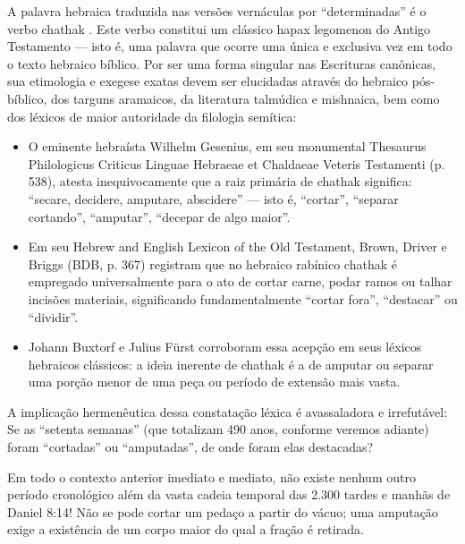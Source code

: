 A palavra hebraica traduzida nas versões vernáculas por ``determinadas'' é o verbo chathak . Este verbo constitui um clássico hapax legomenon do Antigo Testamento — isto é, uma palavra que ocorre uma única e exclusiva vez em todo o texto hebraico bíblico. Por ser uma forma singular nas Escrituras canônicas, sua etimologia e exegese exatas devem ser elucidadas através do hebraico pós-bíblico, dos targuns aramaicos, da literatura talmúdica e mishnaica, bem como dos léxicos de maior autoridade da filologia semítica:
\begin{itemize}
  \item O eminente hebraísta Wilhelm Gesenius, em seu monumental Thesaurus Philologicus Criticus Linguae Hebraeae et Chaldaeae Veteris Testamenti (p. 538), atesta inequivocamente que a raiz primária de chathak significa: ``secare, decidere, amputare, abscidere'' — isto é, ``cortar'', ``separar cortando'', ``amputar'', ``decepar de algo maior''.
  \item Em seu Hebrew and English Lexicon of the Old Testament, Brown, Driver e Briggs (BDB, p. 367) registram que no hebraico rabínico chathak é empregado universalmente para o ato de cortar carne, podar ramos ou talhar incisões materiais, significando fundamentalmente ``cortar fora'', ``destacar'' ou ``dividir''.
  \item Johann Buxtorf e Julius Fürst corroboram essa acepção em seus léxicos hebraicos clássicos: a ideia inerente de chathak é a de amputar ou separar uma porção menor de uma peça ou período de extensão mais vasta.
\end{itemize}


A implicação hermenêutica dessa constatação léxica é avassaladora e irrefutável: Se as ``setenta semanas'' (que totalizam 490 anos, conforme veremos adiante) foram ``cortadas'' ou ``amputadas'', de onde foram elas destacadas?

Em todo o contexto anterior imediato e mediato, não existe nenhum outro período cronológico além da vasta cadeia temporal das 2.300 tardes e manhãs de Daniel 8:14! Não se pode cortar um pedaço a partir do vácuo; uma amputação exige a existência de um corpo maior do qual a fração é retirada.

